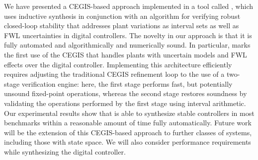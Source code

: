 \documentclass[final]{sig-alternate-05-2015}
\begin{document}
We have presented a CEGIS-based approach implemented in a tool called \tool,
which uses inductive synthesis in conjunction with an algorithm for
verifying robust closed-loop stability that addresses plant variations as
interval sets as well as FWL uncertainties in digital controllers.  The
novelty in our approach is that it is fully automated and algorithmically
and numerically sound.  In particular, \tool marks the first use of the
CEGIS that handles plants with uncertain models and FWL effects over the
digital controller.  Implementing this architecture efficiently requires
adjusting the traditional CEGIS refinement loop to the use of a two-stage
verification engine: here, the first stage performs fast, but potentially
unsound fixed-point operations, whereas the second stage restores soundness
by validating the operations performed by the first stage using interval
arithmetic.  Our experimental results show that \tool is able to synthesize
stable controllers in most benchmarks within a reasonable amount of time
fully automatically.  Future work will be the extension of this CEGIS-based
approach to further classes of systems, including those with state space. 
We will also consider performance requirements while synthesizing the
digital controller.


  

\end{document}
